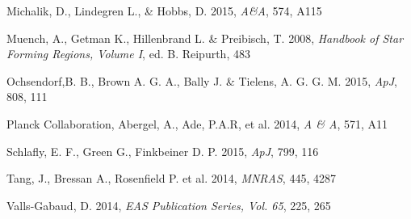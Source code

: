 \documentclass{mem}
\begin{document}
\begin{thebibliography}{}
{Michalik, D., Lindegren L., \& Hobbs, D.} 2015,
\textit{A\&A}, 574, A115 


{Muench, A., Getman K., Hillenbrand L. \& Preibisch, T.} 2008,
\textit{Handbook of Star Forming Regions, Volume I}, ed. B. Reipurth, 483 

{Ochsendorf,B. B., Brown A. G. A., Bally J. \& Tielens, A. G. G. M.} 2015,
\textit{ApJ}, 808, 111

{Planck Collaboration, Abergel, A., Ade, P.A.R, et al.} 2014,
\textit{A \& A}, 571, A11 


{Schlafly, E. F., Green G., Finkbeiner D. P.} 2015,
\textit{ApJ}, 799, 116 

{Tang, J., Bressan A., Rosenfield P. et al.} 2014,
\textit{MNRAS}, 445, 4287 


{Valls-Gabaud, D.} 2014,
\textit{EAS Publication Series, Vol. 65}, 225, 265 


\end{thebibliography}
\end{document}

